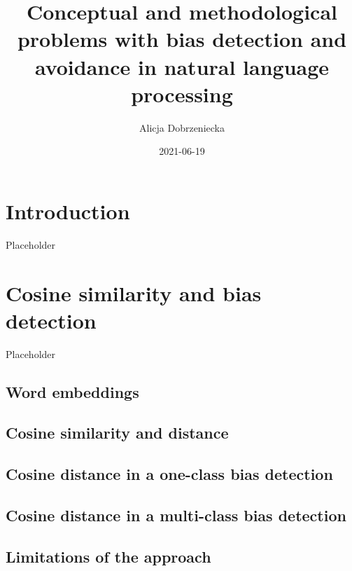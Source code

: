 \documentclass[
  12pt,
]{book}
\title{Conceptual and methodological problems with bias detection and avoidance in natural language processing}
\author{Alicja Dobrzeniecka}
\date{2021-06-19}
\begin{document}
\maketitle

{
\setcounter{tocdepth}{5}
\tableofcontents
}
\hypertarget{introduction}{%
\chapter{Introduction}\label{introduction}}

Placeholder

\hypertarget{cosine-similarity-and-bias-detection}{%
\chapter{Cosine similarity and bias detection}\label{cosine-similarity-and-bias-detection}}

Placeholder

\hypertarget{word-embeddings}{%
\section{Word embeddings}\label{word-embeddings}}

\hypertarget{cosine-similarity-and-distance}{%
\section{Cosine similarity and distance}\label{cosine-similarity-and-distance}}

\hypertarget{cosine-distance-in-a-one-class-bias-detection}{%
\section{Cosine distance in a one-class bias detection}\label{cosine-distance-in-a-one-class-bias-detection}}

\hypertarget{cosine-distance-in-a-multi-class-bias-detection}{%
\section{Cosine distance in a multi-class bias detection}\label{cosine-distance-in-a-multi-class-bias-detection}}

\hypertarget{limitations-of-the-approach}{%
\section{Limitations of the approach}\label{limitations-of-the-approach}}
\end{document}
